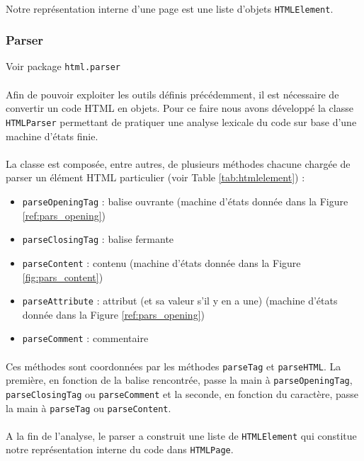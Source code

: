 \documentclass[a4paper,11pt]{article}
\newcommand{\ttseek}[1]{Voir package \texttt{#1}\paragraph{}}
\begin{document}
\paragraph{}
Notre représentation interne d'une page est une liste d'objets \texttt{HTMLElement}.
\subsubsection{Parser}
\ttseek{html.parser}
Afin de pouvoir exploiter les outils définis précédemment, il est nécessaire de convertir un code HTML en objets. Pour ce faire nous avons développé la classe \texttt{HTMLParser} permettant de pratiquer une analyse lexicale du code sur base d'une machine d'états finie.
\paragraph{}
La classe est composée, entre autres, de plusieurs méthodes chacune chargée de parser un élément HTML particulier (voir Table \ref{tab:htmlelement}) :
\begin{itemize}
	\item \texttt{parseOpeningTag} : balise ouvrante (machine d'états donnée dans la Figure \ref{ref:pars_opening})
	\item \texttt{parseClosingTag} : balise fermante
	\item \texttt{parseContent} : contenu (machine d'états donnée dans la Figure \ref{fig:pars_content})
	\item \texttt{parseAttribute} : attribut (et sa valeur s'il y en a une) (machine d'états donnée dans la Figure \ref{ref:pars_opening})
	\item \texttt{parseComment} : commentaire
\end{itemize}
\paragraph{}
Ces méthodes sont coordonnées par les méthodes \texttt{parseTag} et \texttt{parseHTML}. La première, en fonction de la balise rencontrée, passe la main à \texttt{parseOpeningTag}, \texttt{parseClosingTag} ou \texttt{parseComment} et la seconde, en fonction du caractère, passe la main à \texttt{parseTag} ou \texttt{parseContent}.
\paragraph{}
A la fin de l'analyse, le parser a construit une liste de \texttt{HTMLElement} qui constitue notre représentation interne du code dans \texttt{HTMLPage}.
\end{document}

